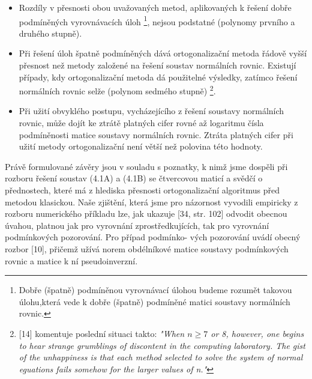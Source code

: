 \begin{itemize}
\item[1.]
Rozdíly v přesnosti obou uvažovaných metod, aplikovaných k
řešení dobře podmíněných vyrovnávacích úloh%
\footnote{
   Dobře (špatně) podmíněnou vyrovnávací úlohou budeme rozumět
   takovou úlohu,která vede k dobře (špatně) podmíněné matici
   soustavy normálních rovnic.},
%
nejsou podstatné (polynomy prvního a druhého stupně).

\item[2.]
Při řešení úloh špatně podmíněných dává ortogonalizační
metoda řádově vyšší přesnost než metody založené na řešení
soustav normálních rovnic. Existují případy, kdy ortogonalizační
metoda dá použitelné výsledky, zatímco řešení normálních
rovnic selže (polynom sedmého stupně)%
\footnote{
 [14] komentuje poslední situaci takto:
   \emph{"When $n \ge 7$ or 8, however, one begins to hear strange grumblings
   of discontent in the computing laboratory. The gist of the
   unhappiness is that each method selected to solve the system
   of normal eguations fails somehow for the larger values of n."}
}.

\item[3.]
Při užití obvyklého postupu, vycházejícího z řešení soustavy
normálních rovnic, může dojít ke ztrátě platných cifer rovné až
logaritmu čísla podmíněnosti matice soustavy normálních rovnic.
Ztráta platných cifer při užití metody ortogonalizační není
větší než polovina této hodnoty.

\end{itemize}


Právě formulované závěry jsou v souladu s poznatky, k nimž jsme
dospěli při rozboru řešení soustav (4.1A) a (4.1B) se čtvercovou
maticí a svědčí o přednostech, které má z hlediska přesnosti
ortogonalizační algoritmus před metodou klasickou. Naše zjištění,
která jsme pro názornost vyvodili empiricky z rozboru numerického
příkladu lze, jak ukazuje  [34, str. 102] odvodit
obecnou úvahou, platnou jak pro vyrovnání zprostředkujících, tak pro
vyrovnání podmínkových pozorování. Pro případ podmínko- vých
pozorování uvádí obecný rozbor  [10], přičemž užívá
norem obdélníkové matice soustavy podmínkových rovnic a matice k ní
pseudoinverzní.
